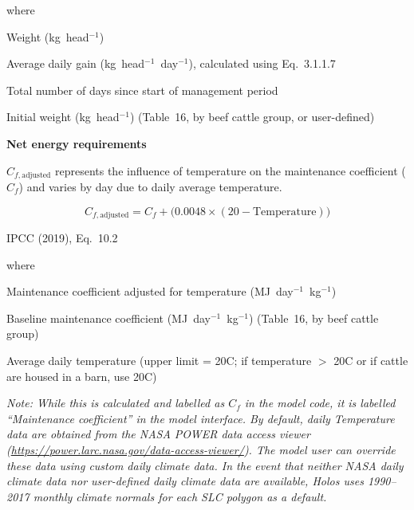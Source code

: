 \noindent where
\begin{description}[font=\normalfont, leftmargin=9em, style=sameline, nosep]
    \item[$\mathrm{Weight}$] Weight (kg~head$^{-1}$)
    \item[$\mathrm{ADG}$] Average daily gain (kg~head$^{-1}$~day$^{-1}$), calculated
          using Eq.~3.1.1.7
    \item[$\mathrm{days}$] Total number of days since start of management period
    \item[$\mathrm{wt}_{\mathrm{initial}}$] Initial weight (kg~head$^{-1}$) (Table~16,
          by beef cattle group, or user-defined)
\end{description}

\bigskip
\noindent\textbf{Net energy requirements}

$C_{f,\mathrm{adjusted}}$ represents the influence of temperature on the maintenance
coefficient ($C_f$) and varies by day due to daily average temperature.

\begin{equation}
    C_{f,\mathrm{adjusted}} = C_f + \bigl(0.0048 \times (20 - \mathrm{Temperature})\bigr)
    \tag{Eq.\ 3.1.1.2}
\end{equation}

\noindent IPCC (2019), Eq.~10.2

\noindent where
\begin{description}[font=\normalfont, leftmargin=9em, style=sameline, nosep]
    \item[$C_{f,\mathrm{adjusted}}$] Maintenance coefficient adjusted for temperature
          (MJ~day$^{-1}$~kg$^{-1}$)
    \item[$C_f$] Baseline maintenance coefficient (MJ~day$^{-1}$~kg$^{-1}$) (Table~16,
          by beef cattle group)
    \item[$\mathrm{Temperature}$] Average daily temperature (upper limit = 20\textdegree{}C;
          if temperature $>$ 20\textdegree{}C or if cattle are housed in a barn, use
          20\textdegree{}C)
\end{description}

\noindent\textit{Note: While this is calculated and labelled as $C_f$ in the model
code, it is labelled ``Maintenance coefficient'' in the model interface. By default,
daily Temperature data are obtained from the NASA POWER data access viewer
(\url{https://power.larc.nasa.gov/data-access-viewer/}). The model user can override
these data using custom daily climate data. In the event that neither NASA daily climate
data nor user-defined daily climate data are available, Holos uses 1990--2017 monthly
climate normals for each SLC polygon as a default.}

